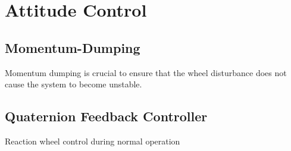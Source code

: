 \section{Attitude Control}
\subsection{Momentum-Dumping}
Momentum dumping is crucial to ensure that the wheel disturbance does not cause the system to become unstable.

\subsection{Quaternion Feedback Controller}
Reaction wheel control during normal operation

%
%	
%	
%	
%	
%	
%	
%	


